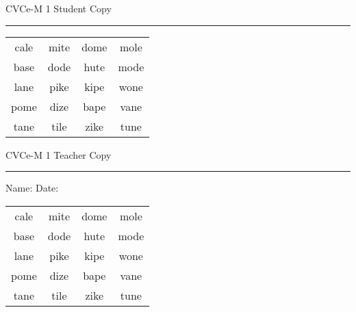 \documentclass{memoir}
\begin{document}

\footnotesize \noindent
CVCe-M 1 \hfill Student Copy
\smallskip
\hrule

\Large

\setlength{\tabcolsep}{14pt}
\def\arraystretch{2}

{\selectfont


\begin{vplace}[0.5]
\begin{center}
\begin{tabular}{cccc}
cale & mite & dome & mole \\
base & dode & hute & mode \\
lane & pike & kipe & wone \\
pome & dize & bape & vane \\
tane & tile & zike & tune \\
\end{tabular}
\end{center}
\end{vplace}

}

\newpage

\footnotesize \noindent
CVCe-M 1 \hfill Teacher Copy
\smallskip
\hrule

\small

\vfill

\noindent
Name: \underline{\hspace{1.75in}} \hfill Date: \underline{\hspace{1in}}

\Large

{\selectfont


\begin{vplace}[0.5]
\begin{center}
\begin{tabular}{cccc}
cale & mite & dome & mole \\
base & dode & hute & mode \\
lane & pike & kipe & wone \\
pome & dize & bape & vane \\
tane & tile & zike & tune \\
\end{tabular}
\end{center}
\end{vplace}



}
\end{document}
